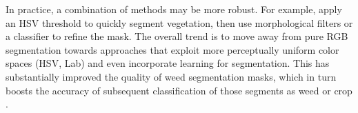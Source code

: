 \documentclass[letterpaper]{report}
\begin{document}
%
In practice, a combination of methods may be more robust. For example, apply an HSV threshold to quickly segment vegetation, then use morphological filters or a classifier to refine the mask. The overall trend  is to move away from pure RGB segmentation towards approaches that exploit more perceptually uniform color spaces (HSV, Lab) and even incorporate learning for segmentation. This has substantially improved the quality of weed segmentation masks, which in turn boosts the accuracy of subsequent classification of those segments as weed or crop  \parencite{Wu2021-gt}.
%
\end{document}
